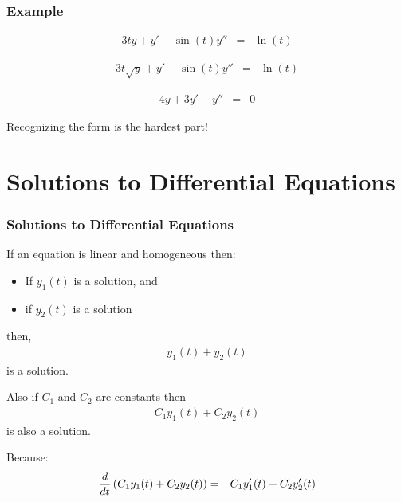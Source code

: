 \begin{frame}
  \frametitle{Example}

  \vspace*{-3em}
  \begin{eqnarray*}
    3t y + y' - \sin(t) y'' & = & \ln(t)
  \end{eqnarray*}
  \centerline{}

  \begin{eqnarray*}
    3t \sqrt{y} + y' - \sin(t) y'' & = & \ln(t)
  \end{eqnarray*}
  \centerline{}

  \begin{eqnarray*}
    4 y + 3 y' -  y'' & = & 0
  \end{eqnarray*}
  \centerline{}

  Recognizing the form is the hardest part!

\end{frame}

\section{Solutions to Differential Equations}

\begin{frame}
  \frametitle{Solutions to Differential Equations}

  If an equation is linear and homogeneous then:
  \begin{itemize}
  \item If $y_1(t)$ is a solution, and
  \item if $y_2(t)$ is a solution
  \end{itemize}

  then, 
  \begin{eqnarray*}
    y_1(t) + y_2(t)
  \end{eqnarray*}
  is a solution.

  Also if $C_1$ and $C_2$ are constants then
  \begin{eqnarray*}
    C_1 y_1(t) + C_2 y_2(t)
  \end{eqnarray*}
  is also a solution.

  Because:
  \begin{eqnarray*}
    \frac{d}{dt} \left( C_1 y_1(t) + C_2 y_2(t) \right) & = & 
    C_1 y_1'(t) + C_2 y_2'(t)
  \end{eqnarray*}


\end{frame}


